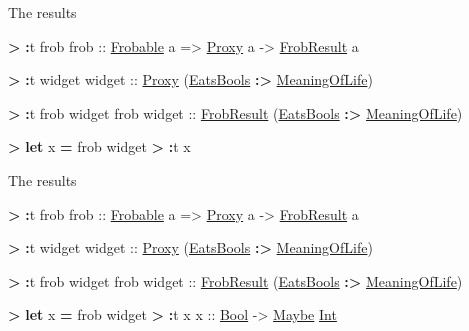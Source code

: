 \documentclass[ignorenonframetext,]{beamer}
\newenvironment{Shaded}{}{}
\newcommand{\KeywordTok}[1]{\textcolor[rgb]{0.26,0.66,0.93}{\textbf{{#1}}}}
\newcommand{\DataTypeTok}[1]{\underline{{#1}}}
\newcommand{\OtherTok}[1]{{#1}}
\newcommand{\FunctionTok}[1]{\textcolor[rgb]{1.00,0.58,0.35}{\textbf{{#1}}}}
\newcommand{\NormalTok}[1]{{#1}}
\begin{document}
\begin{frame}[fragile]{The results}

\begin{Shaded}
\begin{Highlighting}[]
\FunctionTok{>} \FunctionTok{:}\NormalTok{t frob}
\OtherTok{frob ::} \DataTypeTok{Frobable} \NormalTok{a }\OtherTok{=>} \DataTypeTok{Proxy} \NormalTok{a }\OtherTok{->} \DataTypeTok{FrobResult} \NormalTok{a}

\FunctionTok{>} \FunctionTok{:}\NormalTok{t widget}
\OtherTok{widget ::} \DataTypeTok{Proxy} \NormalTok{(}\DataTypeTok{EatsBools} \FunctionTok{:>} \DataTypeTok{MeaningOfLife}\NormalTok{)}

\FunctionTok{>} \FunctionTok{:}\NormalTok{t frob widget}
\NormalTok{frob}\OtherTok{ widget ::} \DataTypeTok{FrobResult} \NormalTok{(}\DataTypeTok{EatsBools} \FunctionTok{:>} \DataTypeTok{MeaningOfLife}\NormalTok{)}

\FunctionTok{>} \KeywordTok{let} \NormalTok{x }\FunctionTok{=} \NormalTok{frob widget}
\FunctionTok{>} \FunctionTok{:}\NormalTok{t x}
\end{Highlighting}
\end{Shaded}

\end{frame}

\begin{frame}[fragile]{The results}

\begin{Shaded}
\begin{Highlighting}[]
\FunctionTok{>} \FunctionTok{:}\NormalTok{t frob}
\OtherTok{frob ::} \DataTypeTok{Frobable} \NormalTok{a }\OtherTok{=>} \DataTypeTok{Proxy} \NormalTok{a }\OtherTok{->} \DataTypeTok{FrobResult} \NormalTok{a}

\FunctionTok{>} \FunctionTok{:}\NormalTok{t widget}
\OtherTok{widget ::} \DataTypeTok{Proxy} \NormalTok{(}\DataTypeTok{EatsBools} \FunctionTok{:>} \DataTypeTok{MeaningOfLife}\NormalTok{)}

\FunctionTok{>} \FunctionTok{:}\NormalTok{t frob widget}
\NormalTok{frob}\OtherTok{ widget ::} \DataTypeTok{FrobResult} \NormalTok{(}\DataTypeTok{EatsBools} \FunctionTok{:>} \DataTypeTok{MeaningOfLife}\NormalTok{)}

\FunctionTok{>} \KeywordTok{let} \NormalTok{x }\FunctionTok{=} \NormalTok{frob widget}
\FunctionTok{>} \FunctionTok{:}\NormalTok{t x}
\OtherTok{x ::} \DataTypeTok{Bool} \OtherTok{->} \DataTypeTok{Maybe} \DataTypeTok{Int}
\end{Highlighting}
\end{Shaded}

\end{frame}
\end{document}
